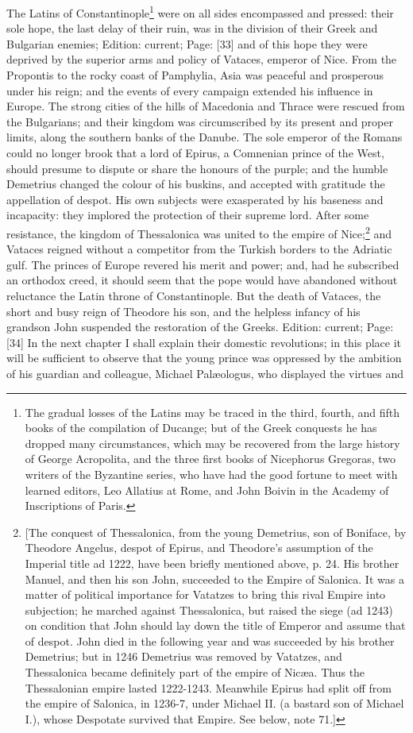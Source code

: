 The Latins of Constantinople\footnote{The gradual losses of the Latins may be traced in the third, fourth, and fifth books of the compilation of Ducange; but of the Greek conquests he has dropped many circumstances, which may be recovered from the large history of George Acropolita, and the three first books of Nicephorus Gregoras, two writers of the Byzantine series, who have had the good fortune to meet with learned editors, Leo Allatius at Rome, and John Boivin in the Academy of Inscriptions of Paris.} were on all sides encompassed and pressed: their sole hope, the last delay of their ruin, was in the division of their Greek and Bulgarian enemies; Edition: current; Page: [33] and of this hope they were deprived by the superior arms and policy of Vataces, emperor of Nice. From the Propontis to the rocky coast of Pamphylia, Asia was peaceful and prosperous under his reign; and the events of every campaign extended his influence in Europe. The strong cities of the hills of Macedonia and Thrace were rescued from the Bulgarians; and their kingdom was circumscribed by its present and proper limits, along the southern banks of the Danube. The sole emperor of the Romans could no longer brook that a lord of Epirus, a Comnenian prince of the West, should presume to dispute or share the honours of the purple; and the humble Demetrius changed the colour of his buskins, and accepted with gratitude the appellation of despot. His own subjects were exasperated by his baseness and incapacity: they implored the protection of their supreme lord. After some resistance, the kingdom of Thessalonica was united to the empire of Nice;\footnote{[The conquest of Thessalonica, from the young Demetrius, son of Boniface, by Theodore Angelus, despot of Epirus, and Theodore\texthebrew{}’s assumption of the Imperial title ad 1222, have been briefly mentioned above, p. 24. His brother Manuel, and then his son John, succeeded to the Empire of Salonica. It was a matter of political importance for Vatatzes to bring this rival Empire into subjection; he marched against Thessalonica, but raised the siege (ad 1243) on condition that John should lay down the title of Emperor and assume that of despot. John died in the following year and was succeeded by his brother Demetrius; but in 1246 Demetrius was removed by Vatatzes, and Thessalonica became definitely part of the empire of Nicæa. Thus the Thessalonian empire lasted 1222-1243. Meanwhile Epirus had split off from the empire of Salonica, in 1236-7, under Michael II. (a bastard son of Michael I.), whose Despotate survived that Empire. See below, note 71.]} and Vataces reigned without a competitor from the Turkish borders to the Adriatic gulf. The princes of Europe revered his merit and power; and, had he subscribed an orthodox creed, it should seem that the pope would have abandoned without reluctance the Latin throne of Constantinople. But the death of Vataces, the short and busy reign of Theodore his son, and the helpless infancy of his grandson John suspended the restoration of the Greeks. Edition: current; Page: [34] In the next chapter I shall explain their domestic revolutions; in this place it will be sufficient to observe that the young prince was oppressed by the ambition of his guardian and colleague, Michael Palæologus, who displayed the virtues and 